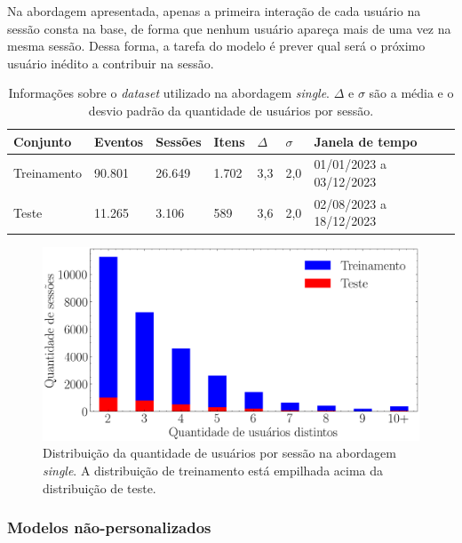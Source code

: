 Na abordagem apresentada, apenas a primeira interação de cada usuário na
sessão consta na base, de forma que nenhum usuário apareça mais de uma vez na
mesma sessão. Dessa forma, a tarefa do modelo é prever qual será o próximo usuário
inédito a contribuir na sessão.


  \begin{table}[htbp]
    \centering
    \begin{tabular}{|l|l|l|l|l|l|l|}
      \hline
      Conjunto & Eventos & Sessões & Itens & $\Delta$ & $\sigma$ & Janela de tempo \\ \hline 
         Treinamento & 90.801 & 26.649 & 1.702 & 3,3 & 2,0 & 01/01/2023 a 03/12/2023 \\ \hline
        Teste & 11.265 & 3.106 & 589 & 3,6 & 2,0 & 02/08/2023 a 18/12/2023 \\ \hline
    \end{tabular}
    \caption{Informações sobre o \textit{dataset} utilizado na abordagem
    \textit{single}. $\Delta$ e $\sigma$ são a média e o desvio padrão da quantidade de
    usuários por sessão.}
    \label{tab:split_data}
  \end{table}

  \begin{figure}[ht]
    \centering
    \includegraphics[width=1\textwidth]{chapters/chap04/images/histograma.png}
    \caption{Distribuição da quantidade de usuários por sessão na abordagem
    \textit{single}. A distribuição de treinamento está empilhada acima da
    distribuição de teste.}
    \label{fig:next-item-single}
  \end{figure}
 

  \subsubsection{Modelos não-personalizados}

